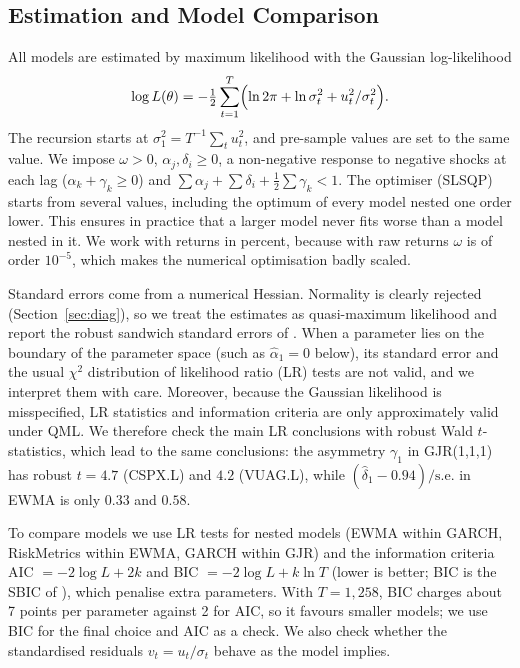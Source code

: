 \documentclass[10pt,a4paper]{article}
\begin{document}
\subsection{Estimation and Model Comparison}
All models are estimated by maximum likelihood with the Gaussian log-likelihood
\begin{equation}
    \log L(\theta) = -\tfrac12\sum_{t=1}^{T}\Bigl(\ln 2\pi + \ln\sigma_t^2 + u_t^2/\sigma_t^2\Bigr).
\end{equation}
The recursion starts at $\sigma_1^2=T^{-1}\sum_t u_t^2$, and pre-sample values are set to the same value.
We impose $\omega>0$, $\alpha_j,\delta_i\ge0$, a non-negative response to negative shocks at each lag
($\alpha_k+\gamma_k\ge0$) and $\sum\alpha_j+\sum\delta_i+\tfrac12\sum\gamma_k<1$. The optimiser (SLSQP)
starts from several values, including the optimum of every model nested one order lower. This
ensures in practice that a larger model never fits worse than a model nested in it. We work with returns in percent, because with raw returns $\omega$ is of
order $10^{-5}$, which makes the numerical optimisation badly scaled.

Standard errors come from a numerical Hessian. Normality is clearly rejected (Section~\ref{sec:diag}), so
we treat the estimates as quasi-maximum likelihood and report the robust sandwich standard errors of
\citet{bollerslev1992}. When a parameter lies on the boundary of the parameter space (such as
$\hat\alpha_1=0$ below), its standard error and the usual $\chi^2$ distribution of likelihood ratio (LR)
tests are not valid, and we interpret them with care. Moreover, because the Gaussian likelihood is
misspecified, LR statistics and information criteria are only approximately valid under QML. We therefore
check the main LR conclusions with robust Wald $t$-statistics, which lead to the same conclusions: the
asymmetry $\gamma_1$ in GJR(1,1,1) has robust $t=4.7$ (CSPX.L) and $4.2$ (VUAG.L), while
$(\hat\delta_1-0.94)/\text{s.e.}$ in EWMA is only $0.33$ and $0.58$.

To compare models we use LR tests for nested models (EWMA within GARCH, RiskMetrics within EWMA, GARCH
within GJR) and the information criteria AIC $=-2\log L+2k$ and BIC $=-2\log L+k\ln T$ (lower is better; BIC is the SBIC of
\citealp{brooks2019}),
which penalise extra parameters. With $T=1{,}258$, BIC charges about 7 points per parameter against 2 for
AIC, so it favours smaller models; we use BIC for the final choice and AIC as a check. We also check
whether the standardised residuals
$v_t = u_t/\sigma_t$ behave as the model implies.
\end{document}
